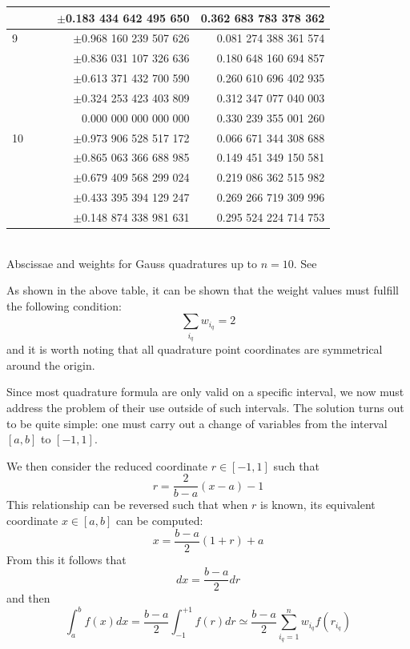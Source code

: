 \begin{center}
\begin{tabular}{lllrr}
  & & & $\pm$0.183 434 642 495 650 & 0.362 683 783 378 362\\
\hline
9 & & & $\pm$0.968 160 239 507 626 & 0.081 274 388 361 574\\
  & & & $\pm$0.836 031 107 326 636 & 0.180 648 160 694 857\\
  & & & $\pm$0.613 371 432 700 590 & 0.260 610 696 402 935\\
  & & & $\pm$0.324 253 423 403 809 & 0.312 347 077 040 003\\
  & & & 0.000 000 000 000 000 & 0.330 239 355 001 260\\
\hline
10 &&& $\pm$0.973 906 528 517 172 & 0.066 671 344 308 688\\
   &&& $\pm$0.865 063 366 688 985 & 0.149 451 349 150 581\\
   &&& $\pm$0.679 409 568 299 024 & 0.219 086 362 515 982\\
   &&& $\pm$0.433 395 394 129 247 & 0.269 266 719 309 996\\
   &&& $\pm$0.148 874 338 981 631 & 0.295 524 224 714 753\\
\hline
\end{tabular}\\
{\captionfont Abscissae and weights for Gauss quadratures up to $n=10$. See \cite[p89]{li06}}
\end{center}



As shown in the above table, it can be shown that the weight values must fulfill the following condition:
\begin{equation}
\sum_{i_q} w_{i_q}=2 \label{gq23}
\end{equation}
and it is worth noting that all quadrature point coordinates are symmetrical around the origin.

Since most quadrature formula are only valid on a specific interval, we now must address the problem 
of their use outside of such intervals. The solution turns out to be quite simple: one 
must carry out a change of variables from the interval $[a,b]$ to $[-1,1]$.

We then consider the reduced coordinate $r\in[-1,1]$ such that 
\[
r=\frac{2}{b-a}(x-a)-1 
\]
This relationship can be reversed such that when $r$ is known, its equivalent coordinate 
$x\in[a,b]$ can be computed:
\[
x=\frac{b-a}{2}(1+r)+a
\]
From this it follows that
\[
dx=\frac{b-a}{2}dr
\]
and then 
\[
\int_a^b f(x) dx  = \frac{b-a}{2} \int_{-1}^{+1} f(r) dr \simeq 
\frac{b-a}{2} \sum_{i_q=1}^n w_{i_q} f(r_{i_q})
\]

